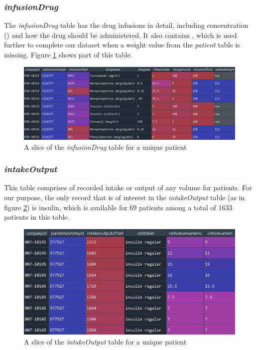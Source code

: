\subsubsection{\textit{infusionDrug}}
The \textit{infusionDrug} table has the drug infusions in detail, including concentration ({\small{}\selectfont{drugamount}}) and how the drug should be administered. It also contains {\small{}\selectfont{patientweight}}, which is used further to complete our dataset when a weight value from the \textit{patient} table is missing. Figure \ref{fig:infusiondrug} shows part of this table.

\begin{figure}[ht]
\centering
\includegraphics[width=15cm]{fig/chapter3/infusiondrug.png}
\caption{A slice of the \textit{infusionDrug} table for a unique patient}
\label{fig:infusiondrug}
\end{figure}

\subsubsection{\textit{intakeOutput}}
This table comprises of recorded intake or output of any volume for patients. For our purpose, the only record that is of interest in the \textit{intakeOutput} table (as in figure \ref{fig:intakeoutput}) is insulin, which is available for 69 patients among a total of 1633 patients in this table.

\begin{figure}[ht]
\centering
\includegraphics[width=15cm]{fig/chapter3/intakeoutput_m.png}
\caption{A slice of the \textit{intakeOutput} table for a unique patient}
\label{fig:intakeoutput}
\end{figure}

